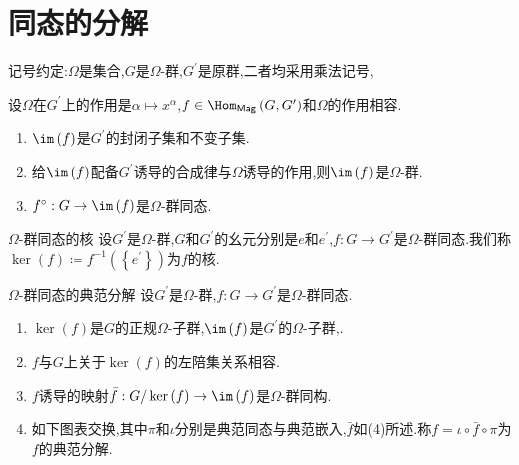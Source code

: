 \section{同态的分解}

记号约定:$\Omega$是集合,$G$是$\Omega$-群,$G^{\prime}$是原群,二者均采用乘法记号,

\begin{proposition}{}{}
		设$\Omega$在$G^{\prime}$上的作用是$\alpha\mapsto x^{\alpha}$,$f\in\Hom_{\mathsf{Mag}}\left(G,G^{\prime}\right)$和$\Omega$的作用相容.
		\begin{enumerate}
			\item $\im\left(f\right)$是$G^{\prime}$的封闭子集和不变子集.
			\item 给$\im\left(f\right)$配备$G^{\prime}$诱导的合成律与$\Omega$诱导的作用,则$\im\left(f\right)$是$\Omega$-群.
			\item $f^{\circ}:G\to\im\left(f\right)$是$\Omega$-群同态.
		\end{enumerate}
\end{proposition}

\begin{definition}{$\Omega$-群同态的核}{}
	设$G^{\prime}$是$\Omega$-群,$G$和$G^{\prime}$的幺元分别是$e$和$e^{\prime}$,$f:G\to G^{\prime}$是$\Omega$-群同态.我们称$\ker\left(f\right)\coloneq f^{-1}\left(\left\{e^{\prime}\right\}\right)$为$f$的核.
\end{definition}

\begin{theorem}{$\Omega$-群同态的典范分解}{}
	设$G^{\prime}$是$\Omega$-群,$f:G\to G^{\prime}$是$\Omega$-群同态.
	\begin{enumerate}
		\item $\ker\left(f\right)$是$G$的正规$\Omega$-子群,$\im\left(f\right)$是$G^{\prime}$的$\Omega$-子群,.
		\item $f$与$G$上关于$\ker\left(f\right)$的左陪集关系相容.
		\item $f$诱导的映射$\bar{f}:G/\ker\left(f\right)\to\im\left(f\right)$是$\Omega$-群同构.
		\item 如下图表交换,其中$\pi$和$\iota$分别是典范同态与典范嵌入,$\bar{f}$如(4)所述.称$f=\iota\circ\bar{f}\circ\pi$为$f$的典范分解.
		\begin{center}
		\end{center}
	\end{enumerate}
\end{theorem}
